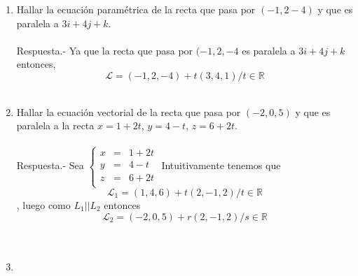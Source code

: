\begin{enumerate}
    \item Hallar la ecuación paramétrica de la recta que pasa por $(-1,2-4)$ y que es paralela a $3i+4j+k$.\\\\
	Respuesta.-\; Ya que la recta que pasa por $(-1,2,-4$ es paralela a $3i+4j+k$ entonces,  $$\mathcal{L}={(-1,2,-4)+t(3,4,1)/t\in\mathbb{R}}$$\\

	
    \item Hallar la ecuación vectorial de la recta que pasa por $(-2,0,5)$ y que es paralela a la recta $x=1+2t$, $y=4-t$, $z=6+2t$.\\\\
	Respuesta.-\; Sea $\left\{\begin{array}{rcr}
		x&=&1+2t\\
		y&=&4-t\\
		z&=&6+2t\\
	\end{array}\right.$
Intuitivamente tenemos que $$\mathcal{L}_1 = {(1,4,6)+t(2,-1,2)/t\in \mathbb{R}}$$, luego como $L_1 || L_2$ entonces $$\mathcal{L}_2 = {(-2,0,5)+r(2,-1,2)/s\in \mathbb{R}}$$\\\\


    \item 


\end{enumerate}
